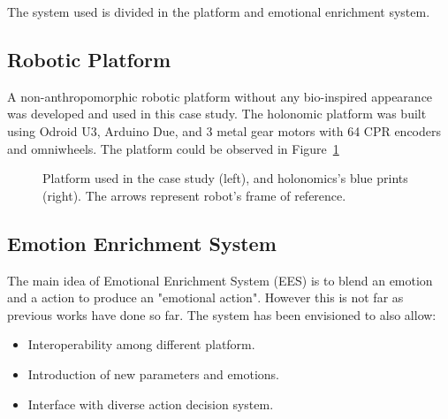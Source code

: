 The system used is divided in the platform and emotional enrichment system. 

\subsection{Robotic Platform}

A non-anthropomorphic robotic platform without any bio-inspired appearance was developed and used in this case study. The holonomic platform was built using Odroid U3, Arduino Due, and 3 metal gear motors with 64 CPR encoders and omniwheels. The platform could be observed in Figure~\ref{fig:Robot}

\begin{figure}[t]
\centering%
\hspace{2mm}
\caption{Platform used in the case study (left), and holonomics's blue prints (right). The arrows represent robot's frame of reference.
\label{fig:Robot}}
\end{figure}

\subsection{Emotion Enrichment System}

The main idea of Emotional Enrichment System (EES) is to blend an emotion and a action to produce an "emotional action". However this is not far as previous works have done so far. The system has been envisioned to also allow:

\begin{itemize}
	\item Interoperability among different platform.
	\item Introduction of new parameters and emotions.
	\item Interface with diverse action decision system.
\end{itemize}

